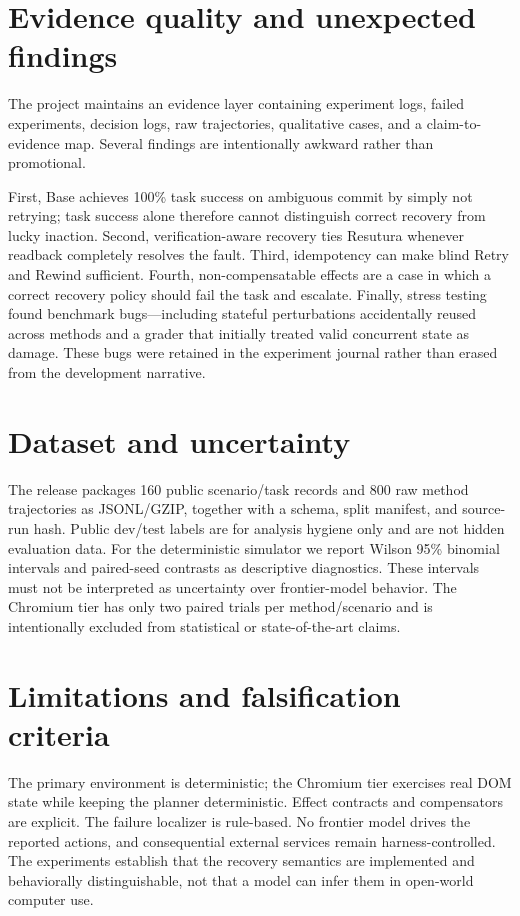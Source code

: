 \documentclass{article}
\begin{document}
\section{Evidence quality and unexpected findings}
The project maintains an evidence layer containing experiment logs, failed experiments, decision logs, raw trajectories, qualitative cases, and a claim-to-evidence map. Several findings are intentionally awkward rather than promotional.

First, Base achieves 100\% task success on ambiguous commit by simply not retrying; task success alone therefore cannot distinguish correct recovery from lucky inaction. Second, verification-aware recovery ties Resutura whenever readback completely resolves the fault. Third, idempotency can make blind Retry and Rewind sufficient. Fourth, non-compensatable effects are a case in which a correct recovery policy should fail the task and escalate. Finally, stress testing found benchmark bugs---including stateful perturbations accidentally reused across methods and a grader that initially treated valid concurrent state as damage. These bugs were retained in the experiment journal rather than erased from the development narrative.

\section{Dataset and uncertainty}
The release packages 160 public scenario/task records and 800 raw method trajectories as JSONL/GZIP, together with a schema, split manifest, and source-run hash. Public dev/test labels are for analysis hygiene only and are not hidden evaluation data. For the deterministic simulator we report Wilson 95\% binomial intervals and paired-seed contrasts as descriptive diagnostics. These intervals must not be interpreted as uncertainty over frontier-model behavior. The Chromium tier has only two paired trials per method/scenario and is intentionally excluded from statistical or state-of-the-art claims.

\section{Limitations and falsification criteria}\label{sec:limitations}
The primary environment is deterministic; the Chromium tier exercises real DOM state while keeping the planner deterministic. Effect contracts and compensators are explicit. The failure localizer is rule-based. No frontier model drives the reported actions, and consequential external services remain harness-controlled. The experiments establish that the recovery semantics are implemented and behaviorally distinguishable, not that a model can infer them in open-world computer use.
\end{document}
